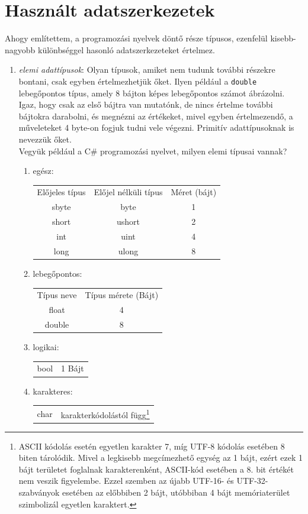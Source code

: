 \documentclass[tocnopagenum]{thesis-ekf}
\theoremstyle{definition}
\theoremstyle{remark}
\begin{document}
	\section{Használt adatszerkezetek}
	Ahogy említettem, a programozási nyelvek döntő része típusos, ezenfelül kisebb-nagyobb különbséggel hasonló adatszerkezeteket értelmez.
	\begin{enumerate}[label=\alph*)]
		\item \emph{elemi adattípusok}: Olyan típusok, amiket nem tudunk további részekre bontani, csak egyben értelmezhetjük őket. Ilyen például a \verb*|double| lebegőpontos típus, amely 8 bájton képes lebegőpontos számot ábrázolni. Igaz, hogy csak az első bájtra van mutatónk, de nincs értelme további bájtokra darabolni, és megnézni az értékeket, mivel egyben értelmezendő, a műveleteket 4 byte-on fogjuk tudni vele végezni. Primitív adattípusoknak is nevezzük őket.\\
		Vegyük például a C\# programozási nyelvet, milyen elemi típusai vannak?
			\begin{enumerate}
				\item egész:
				\begin{tabular}{ccc}
					Előjeles típus & Előjel nélküli típus & Méret (bájt) \\
					sbyte & byte & 1 \\
					short & ushort & 2 \\
					int & uint & 4 \\
					long & ulong & 8 \\
				\end{tabular}
				\item lebegőpontos:
				\begin{tabular}{cc}
					Típus neve & Típus mérete (Bájt) \\
					float & 4 \\
					double & 8
				\end{tabular}
				\item logikai: 
				\begin{tabular}{cc}
					bool & 1 Bájt
				\end{tabular}
				\item karakteres: 
				\begin{tabular}{cc}
					char & karakterkódolástól függ\footnote{ASCII kódolás esetén egyetlen karakter 7, míg UTF-8 kódolás esetében 8 biten tárolódik. Mivel a legkisebb megcímezhető egység az 1 bájt, ezért ezek 1 bájt területet foglalnak karakterenként, ASCII-kód esetében a 8. bit értékét nem veszik figyelembe. 
					Ezzel szemben az újabb UTF-16- és UTF-32-szabványok esetében az előbbiben 2 bájt, utóbbiban 4 bájt memóriaterület szimbolizál egyetlen karaktert.}

\end{tabular}
\end{enumerate}
\end{enumerate}
\end{document}
